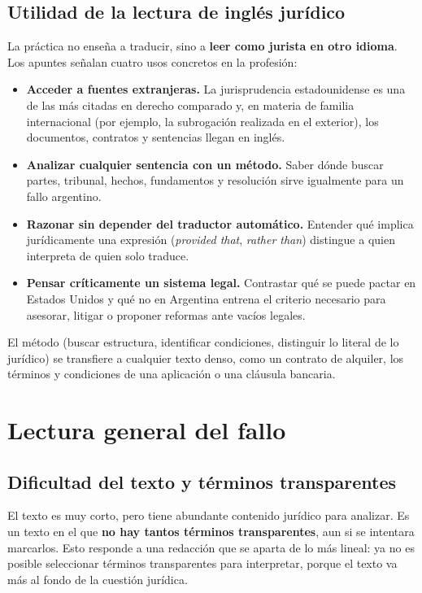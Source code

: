 \documentclass[12pt,oneside]{book}
\begin{document}
\section{Utilidad de la lectura de inglés jurídico}

La práctica no enseña a traducir, sino a \textbf{leer como jurista en otro idioma}. Los apuntes señalan cuatro usos concretos en la profesión:

\begin{itemize}
    \item \textbf{Acceder a fuentes extranjeras.} La jurisprudencia estadounidense es una de las más citadas en derecho comparado y, en materia de familia internacional (por ejemplo, la subrogación realizada en el exterior), los documentos, contratos y sentencias llegan en inglés.
    \item \textbf{Analizar cualquier sentencia con un método.} Saber dónde buscar partes, tribunal, hechos, fundamentos y resolución sirve igualmente para un fallo argentino.
    \item \textbf{Razonar sin depender del traductor automático.} Entender qué implica jurídicamente una expresión (\textit{provided that}, \textit{rather than}) distingue a quien interpreta de quien solo traduce.
    \item \textbf{Pensar críticamente un sistema legal.} Contrastar qué se puede pactar en Estados Unidos y qué no en Argentina entrena el criterio necesario para asesorar, litigar o proponer reformas ante vacíos legales.
\end{itemize}

El método (buscar estructura, identificar condiciones, distinguir lo literal de lo jurídico) se transfiere a cualquier texto denso, como un contrato de alquiler, los términos y condiciones de una aplicación o una cláusula bancaria.

\chapter{Lectura general del fallo}

\section{Dificultad del texto y términos transparentes}

El texto es muy corto, pero tiene abundante contenido jurídico para analizar. Es un texto en el que \textbf{no hay tantos términos transparentes}, aun si se intentara marcarlos. Esto responde a una redacción que se aparta de lo más lineal: ya no es posible seleccionar términos transparentes para interpretar, porque el texto va más al fondo de la cuestión jurídica.
\end{document}
